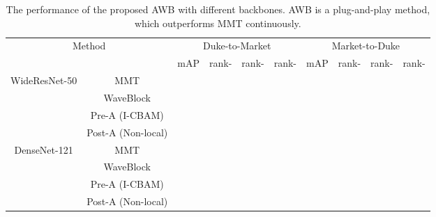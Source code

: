 \documentclass[journal]{IEEEtran}
\begin{document}
\begin{table*}
\centering
\caption{The performance of the proposed AWB with different backbones. AWB is a plug-and-play method, which outperforms MMT \cite{ge2020mutual} continuously.} 
  \begin{tabular}{|*{10}{c|}}
  \hline
    \multicolumn{2}{|c|}{\multirow{2}{*}{Method}}  & \multicolumn{4}{c|}{Duke-to-Market} & \multicolumn{4}{c|}{Market-to-Duke}\\\cline{3-10}
    \multicolumn{2}{|c|}{}   & mAP & rank- & rank- & rank- & mAP & rank- & rank- & rank- \\\hline
    \multirow{4}{*}{WideResNet-50 \cite{zagoruyko2016wide}} & MMT \cite{ge2020mutual} &  &  &  &  &  &  &  &  \\\cline{2-2}
        & WaveBlock &  & &  &  &  &  &  &  \\\cline{2-2}
        & Pre-A (I-CBAM) &  & &  &  &  &  &  &  \\\cline{2-2}
        & Post-A (Non-local) &  &  &  &  &  &  &  &  \\\hline
    \multirow{4}{*}{DenseNet-121 \cite{huang2017densely}} & MMT \cite{ge2020mutual} &  &  &  &  &  &  &  &  \\\cline{2-2}
        & WaveBlock &  &  &  &  &  &  &  &  \\\cline{2-2}
        & Pre-A (I-CBAM) &  &  &  &  &  &  &  &  \\\cline{2-2}
        & Post-A (Non-local) &  &  &  &  &  &  &  &  \\\hline
  \end{tabular}
\label{backbone}
\end{table*}
\end{document}
